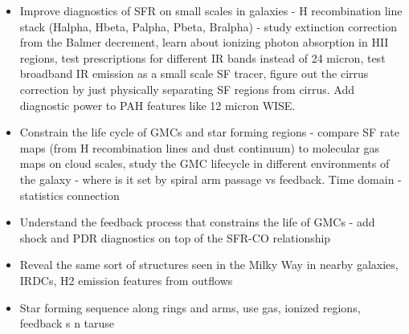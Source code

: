 \documentclass[12pt]{article}
\begin{document}
\begin{itemize}
   
    \item{Improve diagnostics of SFR on small scales in galaxies - H recombination line stack (Halpha, Hbeta, Palpha, Pbeta, Bralpha) - study extinction correction from the Balmer decrement, learn about ionizing photon absorption in HII regions, test prescriptions for different IR bands instead of 24 micron, test broadband IR emission as a small scale SF tracer, figure out the cirrus correction by just physically separating SF regions from cirrus. Add diagnostic power to PAH features like 12 micron WISE.}
    
    \item{Constrain the life cycle of GMCs and star forming regions - compare SF rate maps (from H recombination lines and dust continuum) to molecular gas maps on cloud scales, study the GMC lifecycle in different environments of the galaxy - where is it set by spiral arm passage vs feedback. Time domain - statistics connection}
    
    \item{Understand the feedback process that constrains the life of GMCs - add shock and PDR diagnostics on top of the SFR-CO relationship}
    
    \item{Reveal the same sort of structures seen in the Milky Way in nearby galaxies, IRDCs, H2 emission features from outflows}
    
    \item{Star forming sequence along rings and arms, use gas, ionized regions, feedback s}
n taruse   
\end{itemize}
\end{document}
